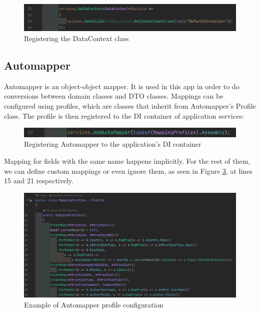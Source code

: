 \begin{figure}[!ht]
    \centering
    \includegraphics[width=1\linewidth]{4.3.1_AddDbContext.png}
    \caption{Registering the DataContext class}
    \label{fig:enter-label}
\end{figure}


\subsection{Automapper}

\par Automapper is an object-object mapper. It is used in this app in order to do conversions between domain classes and DTO classes. Mappings can be configured using profiles, which are classes that inherit from Automapper's Profile class. The profile is then registered to the DI container of application services:

\begin{figure}[!ht]
    \centering
    \includegraphics[width=1\linewidth]{4.3.2_automapper-injection.png}
    \caption{Registering Automapper to the application's DI container}
    \label{fig:automapper-injection}
\end{figure}

\clearpage %

\par Mapping for fields with the same name happens implicitly. For the rest of them, we can define custom mappings or even ignore them, as seen in Figure \ref{fig:automapper-profile}, at lines 15 and 21 respectively.

\begin{figure}[!ht]
        \centering
        \includegraphics[width=1\linewidth]{4.3.2_automapper-profile.png}
        \caption{Example of Automapper profile configuration}
        \label{fig:automapper-profile}
\end{figure}


